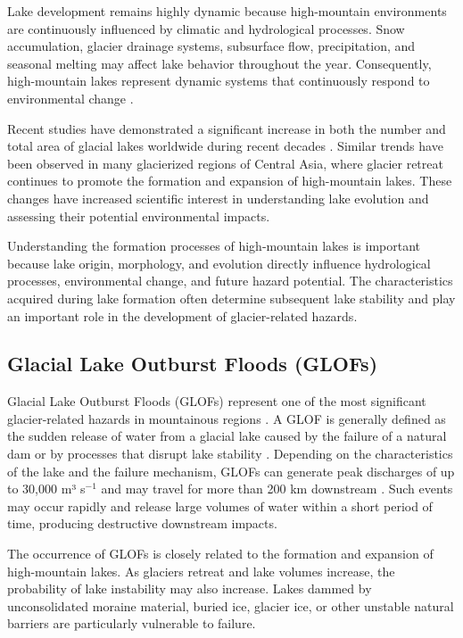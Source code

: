 \documentclass[12pt,a4paper]{report}
\begin{document}
Lake development remains highly dynamic because high-mountain environments are continuously influenced by climatic and hydrological processes. Snow accumulation, glacier drainage systems, subsurface flow, precipitation, and seasonal melting may affect lake behavior throughout the year. Consequently, high-mountain lakes represent dynamic systems that continuously respond to environmental change \cite{Worni2013, Zaginaev2019}. 

Recent studies have demonstrated a significant increase in both the number and total area of glacial lakes worldwide during recent decades \cite{Shugar2021}. Similar trends have been observed in many glacierized regions of Central Asia, where glacier retreat continues to promote the formation and expansion of high-mountain lakes. These changes have increased scientific interest in understanding lake evolution and assessing their potential environmental impacts. 

Understanding the formation processes of high-mountain lakes is important because lake origin, morphology, and evolution directly influence hydrological processes, environmental change, and future hazard potential. The characteristics acquired during lake formation often determine subsequent lake stability and play an important role in the development of glacier-related hazards.

\subsection{Glacial Lake Outburst Floods (GLOFs)}  

Glacial Lake Outburst Floods (GLOFs) represent one of the most significant glacier-related hazards in mountainous regions \cite{Clague2000}. A GLOF is generally defined as the sudden release of water from a glacial lake caused by the failure of a natural dam or by processes that disrupt lake stability \cite{Clague2000}. Depending on the characteristics of the lake and the failure mechanism, GLOFs can generate peak discharges of up to 30,000 m³ s$^{-1}$ and may travel for more than 200 km downstream \cite{Richardson2000}. Such events may occur rapidly and release large volumes of water within a short period of time, producing destructive downstream impacts. 

The occurrence of GLOFs is closely related to the formation and expansion of high-mountain lakes. As glaciers retreat and lake volumes increase, the probability of lake instability may also increase. Lakes dammed by unconsolidated moraine material, buried ice, glacier ice, or other unstable natural barriers are particularly vulnerable to failure. 
\end{document}
